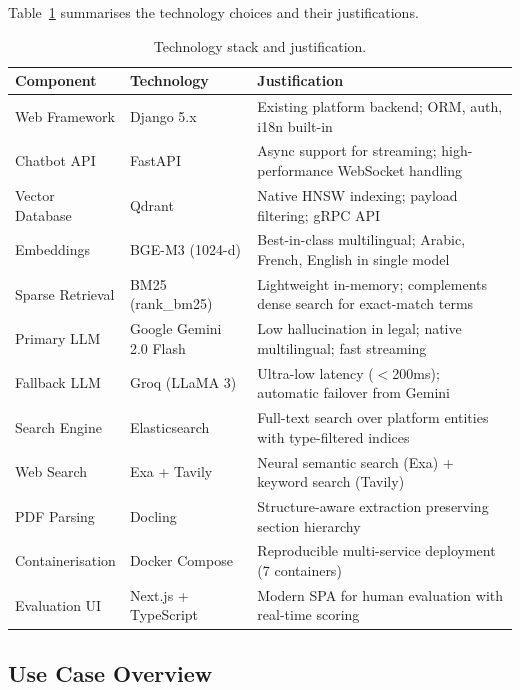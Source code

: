 \documentclass[12pt, a4paper]{article}
\begin{document}
Table~\ref{tab:techstack} summarises the technology choices and their
justifications.

\begin{table}[H]
\centering
\caption{Technology stack and justification.}
\label{tab:techstack}
\small
\begin{tabularx}{\textwidth}{l l X}
\toprule
\rowcolor{tablehead}\color{white}\textbf{Component} & \color{white}\textbf{Technology} & \color{white}\textbf{Justification} \\
\midrule
Web Framework & Django 5.x & Existing platform backend; ORM, auth, i18n built-in \\
\rowcolor{lightgray}
Chatbot API & FastAPI & Async support for streaming; high-performance WebSocket handling \\
Vector Database & Qdrant & Native HNSW indexing; payload filtering; gRPC API \\
\rowcolor{lightgray}
Embeddings & BGE-M3 (1024-d) & Best-in-class multilingual; Arabic, French, English in single model \\
Sparse Retrieval & BM25 (rank\_bm25) & Lightweight in-memory; complements dense search for exact-match terms \\
\rowcolor{lightgray}
Primary LLM & Google Gemini 2.0 Flash & Low hallucination in legal; native multilingual; fast streaming \\
Fallback LLM & Groq (LLaMA 3) & Ultra-low latency ($<$200ms); automatic failover from Gemini \\
\rowcolor{lightgray}
Search Engine & Elasticsearch & Full-text search over platform entities with type-filtered indices \\
Web Search & Exa + Tavily & Neural semantic search (Exa) + keyword search (Tavily) \\
\rowcolor{lightgray}
PDF Parsing & Docling & Structure-aware extraction preserving section hierarchy \\
Containerisation & Docker Compose & Reproducible multi-service deployment (7 containers) \\
\rowcolor{lightgray}
Evaluation UI & Next.js + TypeScript & Modern SPA for human evaluation with real-time scoring \\
\bottomrule
\end{tabularx}
\end{table}

\subsection{Use Case Overview}
\end{document}
